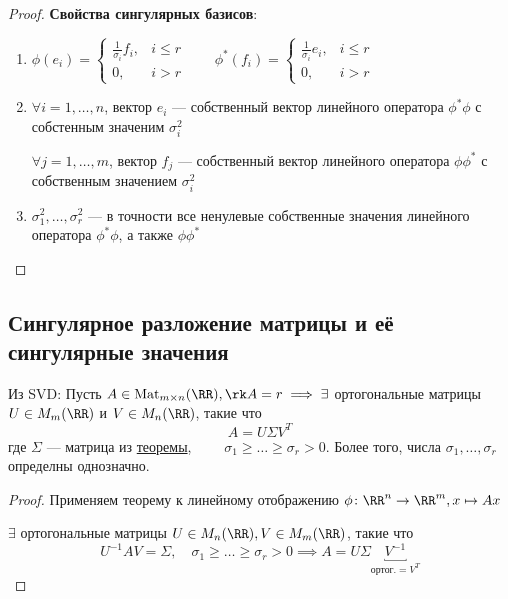 \begin{proof}
    \textbf{Свойства сингулярных базисов}:
    \begin{enumerate}
        \item 
            $\phi(e_i) = \begin{cases}
            \frac{1}{\sigma_i} f_i, & i \leq r \\
            0, & i > r
            \end{cases} \qquad 
            \phi^{*}(f_i) = \begin{cases}
                \frac{1}{\sigma_i} e_i, & i \leq r \\
                0, & i > r
            \end{cases}$

        \item $\forall i = 1, \dots, n$, вектор $e_i$ --- собственный вектор линейного оператора $\phi^{*} \phi$ с собстенным значеним $\sigma_i^2$
        
        $\forall j = 1, \dots, m$, вектор $f_j$ --- собственный вектор линейного оператора $\phi \phi^{*}$ с собственным значением $\sigma_i^2$

        \item $\sigma_1^2, \dots, \sigma_r^2$ --- в точности все ненулевые собственные значения линейного оператора $\phi^{*} \phi$, а также $\phi \phi^{*}$

    \end{enumerate}
\end{proof}

\subsection{Сингулярное разложение матрицы и её сингулярные значения}

\begin{corollary}
    Из SVD: Пусть $A \in \text{Mat}_{m \times n}(\RR), \rk A = r \implies \exists$ ортогональные матрицы $U \in M_m (\RR)$ и $V \in M_n (\RR)$, такие что 
    \begin{equation*}
        A = U \Sigma V^T
    \end{equation*}
    где $\Sigma$ --- матрица из \hyperref[lec31:SVD_matrix]{теоремы}, $\qquad \sigma_1 \geq \dots \geq \sigma_r > 0$. Более того, числа $\sigma_1, \dots, \sigma_r$ определны однозначно.
\end{corollary}

\begin{proof}
    Применяем теорему к линейному отображению $\phi \colon \RR^n \to \RR^m, x \mapsto   A x$

    $\exists$ ортогональные матрицы $U \in M_n (\RR), V \in M_m (\RR)$, такие что
    \begin{equation*}
        U^{-1} A V = \hyperref[lec31:SVD_matrix]{\Sigma}, \quad  \sigma_1 \geq \dots \geq \sigma_r > 0 \implies A = U \Sigma \underbracket{V^{-1}}_{\text{ортог.} = V^T}
    \end{equation*}
\end{proof}

